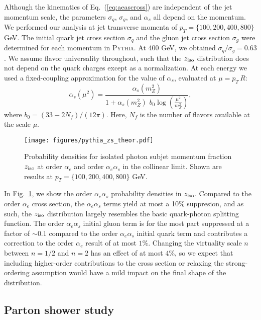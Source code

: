 \documentclass[a4paper,11pt]{article}
\DeclareRobustCommand{\Fig}[1]{Fig.~\ref{#1}}
\DeclareRobustCommand{\Eq}[1]{Eq.~(\ref{#1})}
\newcommand{\ziso}{z_{\rm iso}}
\begin{document}
Although the kinematics of \Eq{eq:aeascross} are independent of the jet momentum scale, the parameters $\sigma_q$, $\sigma_g$, and $\alpha_s$ all depend on the momentum.
%
We performed our analysis at jet transverse momenta of $p_T = \{100, 200, 400, 800\}$ GeV.
%
The initial quark jet cross section $\sigma_q$ and the gluon jet cross section $\sigma_g$ were determined for each momentum in \textsc{Pythia}. At 400 GeV, we obtained $\sigma_q/\sigma_g = 0.63$.  We assume flavor universality throughout, such that the $\ziso$ distribution does not depend on the quark charges except as a normalization.
%
At each energy we used a fixed-coupling approximation for the value of $\alpha_s$, evaluated at $\mu = p_T \, R$:
%
\begin{equation}
	\alpha_s(\mu^2) = \frac{\alpha_s(m_Z^2)}{1 + \alpha_s(m_Z^2) \,\, b_0 \log\left(\frac{\mu^2}{m_Z^2}\right)},
\end{equation}
where $b_0 = (33 - 2 N_f)/(12 \pi)$. Here, $N_f$ is the number of flavors available at the scale $\mu$.

\begin{figure}[t]
    \centering
    \texttt{[image: figures/pythia\_zs\_theor.pdf]}
    \caption{
    Probability densities for isolated photon subjet momentum fraction $\ziso$ at order $\alpha_e$ and order $\alpha_e \alpha_s$ in the collinear limit.
    Shown are results at $p_T = \{100, 200, 400, 800\}$ GeV.}
\label{fig:theor_results}
\end{figure}

In \Fig{fig:theor_results}, we show the order $\alpha_e \alpha_s$ probability densities in $\ziso$.
%
Compared to the order $\alpha_e$ cross section, the $\alpha_e \alpha_s$ terms yield at most a 10\% suppresion, and as such, the $\ziso$ distribution largely resembles the basic quark-photon splitting function.
%
The order $\alpha_e \alpha_s$ initial gluon term is for the most part suppressed at a factor of $\sim 0.1$ compared to the order $\alpha_e \alpha_s$ initial quark term and contributes a correction to the order $\alpha_e$ result of at most $1\%$.
%
Changing the virtuality scale $n$ between $n = 1/2$ and $n = 2$ has an effect of at most $4 \%$, so we expect that including higher-order contributions to the cross section or relaxing the strong-ordering assumption would have a mild impact on the final shape of the distribution.

\subsection{Parton shower study}
\label{sec:3.4}
\end{document}
